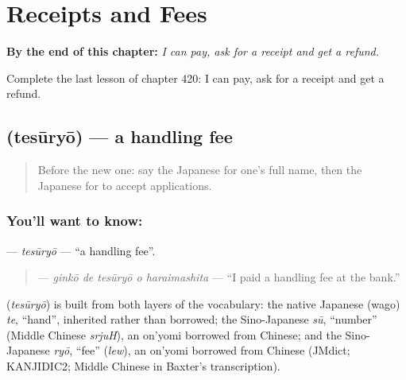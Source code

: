 
\chapter{Receipts and Fees}
\label{ch:ja-receipts-and-fees}

\begin{chapteropening}
\textbf{By the end of this chapter:} \emph{I can pay, ask for a receipt and get a refund.}

Complete the last lesson of chapter 420: I can pay, ask for a receipt and get a refund.
\end{chapteropening}

\section[\texorpdfstring{\ja{てすうりょう} (tesūryō)}{てすうりょう (tesūryō)}]{ (tesūryō) — a handling fee}

\label{lesson:JA-C420-tesuuryou}



\begin{quote}
Before the new one: say the Japanese for one's full name, then the Japanese for to accept applications.
\end{quote}

\subsection*{You'll want to know: }
\textbf{} — \emph{tesūryō} — \textquotedblleft{}a handling fee\textquotedblright{}.

\begin{quote}
\textbf{  } — \emph{ginkō de tesūryō o haraimashita} — \textquotedblleft{}I paid a handling fee at the bank.\textquotedblright{}
\end{quote}

\begin{cousinweb}
\textbf{} (\emph{tesūryō}) is built from both layers of the vocabulary: the native Japanese (wago) \emph{te}, \textquotedblleft{}hand\textquotedblright{}, inherited rather than borrowed; the Sino-Japanese \emph{sū}, \textquotedblleft{}number\textquotedblright{} (Middle Chinese \emph{srjuH}), an on'yomi borrowed from Chinese; and the Sino-Japanese \emph{ryō}, \textquotedblleft{}fee\textquotedblright{} (\emph{lew}), an on'yomi borrowed from Chinese (JMdict; KANJIDIC2; Middle Chinese in Baxter's transcription).
\end{cousinweb}

